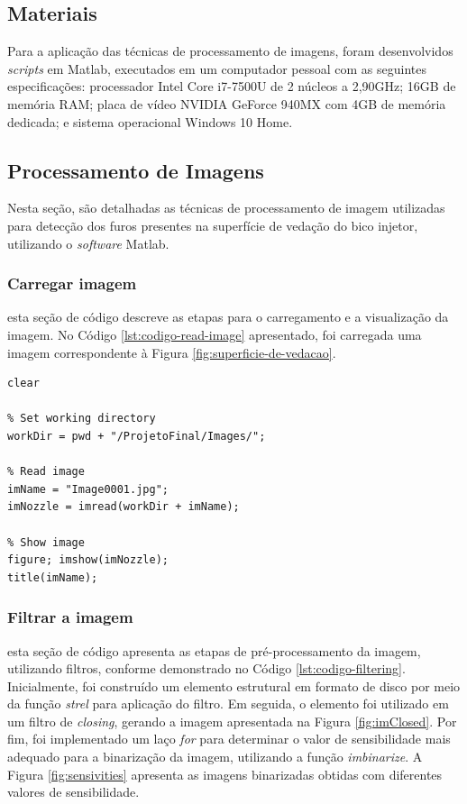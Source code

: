 \documentclass[conference]{IEEEtran}
\begin{document}
\subsection{Materiais}

Para a aplicação das técnicas de processamento de imagens, foram desenvolvidos \textit{scripts} em Matlab, executados em um computador pessoal com as seguintes especificações: processador Intel Core i7-7500U de 2 núcleos a 2,90GHz; 16GB de memória RAM; placa de vídeo NVIDIA GeForce 940MX com 4GB de memória dedicada; e sistema operacional Windows 10 Home. 

\subsection{Processamento de Imagens}

Nesta seção, são detalhadas as técnicas de processamento de imagem utilizadas para detecção dos furos presentes na superfície de vedação do bico injetor, utilizando o \textit{software} Matlab.  

\subsubsection{Carregar imagem} esta seção de código descreve as etapas para o carregamento e a visualização da imagem. No Código \ref{lst:codigo-read-image} apresentado, foi carregada uma imagem correspondente à Figura \ref{fig:superficie-de-vedacao}. 

\begin{lstlisting}[caption={Carregamento e visualização da imagem}, label={lst:codigo-read-image}]
% Clear workspace
clear

% Set working directory
workDir = pwd + "/ProjetoFinal/Images/";

% Read image
imName = "Image0001.jpg";
imNozzle = imread(workDir + imName);

% Show image
figure; imshow(imNozzle);
title(imName);
\end{lstlisting}

\subsubsection{Filtrar a imagem} esta seção de código apresenta as etapas de pré-processamento da imagem, utilizando filtros, conforme demonstrado no Código \ref{lst:codigo-filtering}. Inicialmente, foi construído um elemento estrutural em formato de disco por meio da função \textit{strel} para aplicação do filtro. Em seguida, o elemento foi utilizado em um filtro de \textit{closing}, gerando a imagem apresentada na Figura \ref{fig:imClosed}. Por fim, foi implementado um laço \textit{for} para determinar o valor de sensibilidade mais adequado para a binarização da imagem, utilizando a função \textit{imbinarize}. A Figura \ref{fig:sensivities} apresenta as imagens binarizadas obtidas com diferentes valores de sensibilidade.
\end{document}
